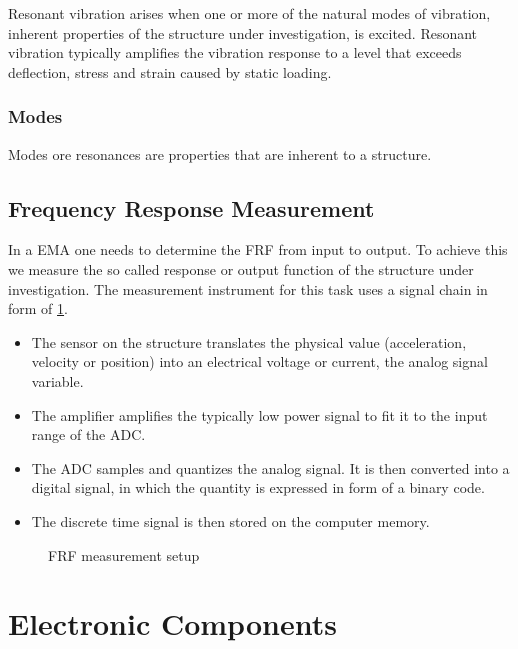 Resonant vibration arises when one or more of the natural modes of vibration, inherent properties of the structure under investigation, is excited. Resonant vibration typically amplifies the vibration response to a level that exceeds deflection, stress and strain caused by static loading. 

\subsubsection{Modes}

Modes ore resonances are properties that are inherent to a structure. 

\subsection{Frequency Response Measurement}

In a \ac{EMA} one needs to determine the \ac{FRF} from input to output. To achieve this we measure the so called response or output function of the structure under investigation. The measurement instrument for this task uses a signal chain in form of \ref{fig:measurment}.
\begin{itemize}
    \item The sensor on the structure translates the physical value (acceleration, velocity or position) into an electrical voltage or current, the analog signal variable.
    \item The amplifier amplifies the typically low power signal to fit it to the input range of the \ac{ADC}.
    \item The \ac{ADC} samples and quantizes the analog signal. It is then converted into a digital signal, in which the quantity is expressed in form of a binary code.
    \item The discrete time signal is then stored on the computer memory.
\end{itemize}
\cite{fu2001modal}

\begin{figure}[!htb]
    \centering
    
    \caption[Frequency Response Measurement]{\ac{FRF} measurement setup}
    \label{fig:measurment}
\end{figure}

\section{Electronic Components}

